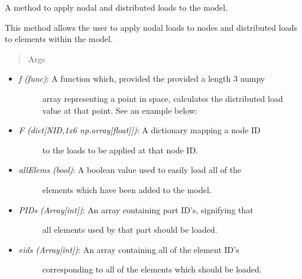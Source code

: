 \documentclass[letterpaper,10pt,english]{sphinxmanual}
\begin{document}
\begin{fulllineitems}
\begin{fulllineitems}
\label{FEM:AeroComBAT.FEM.Model.applyLoads}
A method to apply nodal and distributed loads to the model.

This method allows the user to apply nodal loads to nodes and
distributed loads to elements within the model.
\begin{quote}\begin{description}
\item[{Args}] \leavevmode
\end{description}\end{quote}
\begin{itemize}
\item {} \begin{description}
\item[{\emph{f (func)}: A function which, provided the provided a length 3 numpy}] \leavevmode
array representing a point in space, calculates the distributed
load value at that point. See an example below:

\end{description}

\item {} \begin{description}
\item[{\emph{F (dict{[}NID,1x6 np.array{[}float{]}{]})}: A dictionary mapping a node ID}] \leavevmode
to the loads to be applied at that node ID.

\end{description}

\item {} \begin{description}
\item[{\emph{allElems (bool)}: A boolean value used to easily load all of the}] \leavevmode
elements which have been added to the model.

\end{description}

\item {} \begin{description}
\item[{\emph{PIDs (Array{[}int{]})}: An array containing part ID's, signifying that}] \leavevmode
all elements used by that part should be loaded.

\end{description}

\item {} \begin{description}
\item[{\emph{eids (Array{[}int{]})}: An array containing all of the element ID's}] \leavevmode
corresponding to all of the elements which should be loaded.


\end{description}
\end{itemize}
\end{fulllineitems}
\end{fulllineitems}
\end{document}
